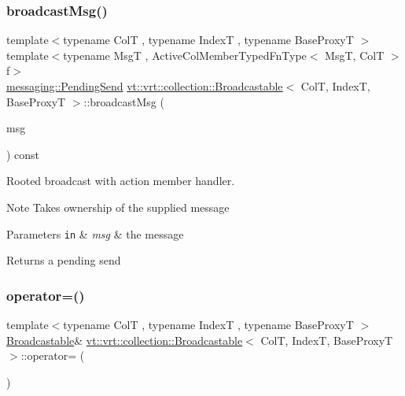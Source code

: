 \subsubsection{\texorpdfstring{broadcast\+Msg()}{broadcastMsg()}\hspace{0.1cm}{\footnotesize\ttfamily [2/2]}}
{\footnotesize\ttfamily template$<$typename ColT , typename IndexT , typename Base\+ProxyT $>$ \\
template$<$typename MsgT , Active\+Col\+Member\+Typed\+Fn\+Type$<$ Msg\+T, Col\+T $>$ f$>$ \\
\hyperlink{structvt_1_1messaging_1_1_pending_send}{messaging\+::\+Pending\+Send} \hyperlink{structvt_1_1vrt_1_1collection_1_1_broadcastable}{vt\+::vrt\+::collection\+::\+Broadcastable}$<$ ColT, IndexT, Base\+ProxyT $>$\+::broadcast\+Msg (\begin{DoxyParamCaption}\item[{\hyperlink{structvt_1_1messaging_1_1_msg_ptr_thief}{messaging\+::\+Msg\+Ptr\+Thief}$<$ MsgT $>$}]{msg }\end{DoxyParamCaption}) const}



Rooted broadcast with action member handler. 

\begin{DoxyNote}{Note}
Takes ownership of the supplied message
\end{DoxyNote}

\begin{DoxyParams}[1]{Parameters}
\mbox{\tt in}  & {\em msg} & the message\\
\hline
\end{DoxyParams}
\begin{DoxyReturn}{Returns}
a pending send 
\end{DoxyReturn}
\mbox{\label{structvt_1_1vrt_1_1collection_1_1_broadcastable_a40df56c587e61448857f71acedce53bc}} 
\subsubsection{\texorpdfstring{operator=()}{operator=()}}
{\footnotesize\ttfamily template$<$typename ColT , typename IndexT , typename Base\+ProxyT $>$ \\
\hyperlink{structvt_1_1vrt_1_1collection_1_1_broadcastable}{Broadcastable}\& \hyperlink{structvt_1_1vrt_1_1collection_1_1_broadcastable}{vt\+::vrt\+::collection\+::\+Broadcastable}$<$ ColT, IndexT, Base\+ProxyT $>$\+::operator= (\begin{DoxyParamCaption}\item[{\hyperlink{structvt_1_1vrt_1_1collection_1_1_broadcastable}{Broadcastable}$<$ ColT, IndexT, Base\+ProxyT $>$ const \&}]{ }\end{DoxyParamCaption})\hspace{0.3cm}{\ttfamily [default]}}




